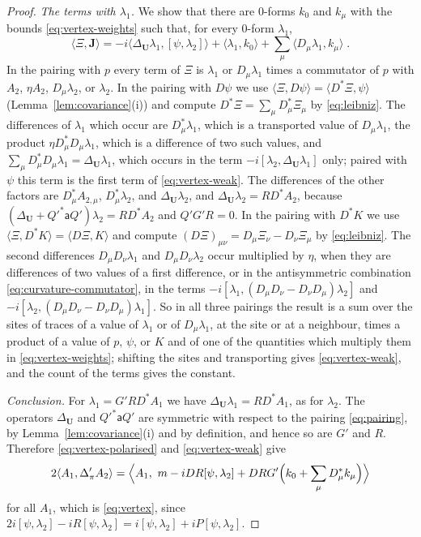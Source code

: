 \documentclass[11pt]{preprint}
\numberwithin{equation}{section}
\begin{document}
\begin{proof}
\emph{The terms with $\lambda_1$.} We show that there are $0$-forms $k_0$ and $k_\mu$ with the bounds \eqref{eq:vertex-weights} such that, for every $0$-form $\lambda_1$,
\begin{equation}\label{eq:vertex-weak}
    \langle\Xi, \mathbf J\rangle = -i\bigl\langle\Delta_{\mathbf U}\lambda_1, [\psi, \lambda_2]\bigr\rangle + \langle\lambda_1, k_0\rangle + \sum_\mu\langle D_\mu\lambda_1, k_\mu\rangle\;.
\end{equation}
In the pairing with $p$ every term of $\Xi$ is $\lambda_1$ or $D_\mu\lambda_1$ times a commutator of $p$ with $A_2$, $\eta A_2$, $D_\mu\lambda_2$, or $\lambda_2$. In the pairing with $D\psi$ we use $\langle\Xi, D\psi\rangle = \langle D^*\Xi, \psi\rangle$ (Lemma~\ref{lem:covariance}(i)) and compute $D^*\Xi = \sum_\mu D^*_\mu\Xi_\mu$ by \eqref{eq:leibniz}. The differences of $\lambda_1$ which occur are $D^*_\mu\lambda_1$, which is a transported value of $D_\mu\lambda_1$, the product $\eta D^*_\mu D_\mu\lambda_1$, which is a difference of two such values, and $\sum_\mu D^*_\mu D_\mu\lambda_1 = \Delta_{\mathbf U}\lambda_1$, which occurs in the term $-i[\lambda_2, \Delta_{\mathbf U}\lambda_1]$ only; paired with $\psi$ this term is the first term of \eqref{eq:vertex-weak}. The differences of the other factors are $D^*_\mu A_{2,\mu}$, $D^*_\mu\lambda_2$, and $\Delta_{\mathbf U}\lambda_2$, and $\Delta_{\mathbf U}\lambda_2 = RD^*A_2$, because $(\Delta_{\mathbf U} + Q'^*\mathsf aQ')\lambda_2 = RD^*A_2$ and $Q'G'R = 0$. In the pairing with $D^*K$ we use $\langle\Xi, D^*K\rangle = \langle D\Xi, K\rangle$ and compute $(D\Xi)_{\mu\nu} = D_\mu\Xi_\nu - D_\nu\Xi_\mu$ by \eqref{eq:leibniz}. The second differences $D_\mu D_\nu\lambda_1$ and $D_\mu D_\nu\lambda_2$ occur multiplied by $\eta$, when they are differences of two values of a first difference, or in the antisymmetric combination \eqref{eq:curvature-commutator}, in the terms $-i[\lambda_1, (D_\mu D_\nu - D_\nu D_\mu)\lambda_2]$ and $-i[\lambda_2, (D_\mu D_\nu - D_\nu D_\mu)\lambda_1]$. So in all three pairings the result is a sum over the sites of traces of a value of $\lambda_1$ or of $D_\mu\lambda_1$, at the site or at a neighbour, times a product of a value of $p$, $\psi$, or $K$ and of one of the quantities which multiply them in \eqref{eq:vertex-weights}; shifting the sites and transporting gives \eqref{eq:vertex-weak}, and the count of the terms gives the constant.

\emph{Conclusion.} For $\lambda_1 = G'RD^*A_1$ we have $\Delta_{\mathbf U}\lambda_1 = RD^*A_1$, as for $\lambda_2$. The operators $\Delta_{\mathbf U}$ and $Q'^*\mathsf aQ'$ are symmetric with respect to the pairing \eqref{eq:pairing}, by Lemma~\ref{lem:covariance}(i) and by definition, and hence so are $G'$ and $R$. Therefore \eqref{eq:vertex-polarised} and \eqref{eq:vertex-weak} give
\[
    2\langle A_1, \Delta'_\pi A_2\rangle = \Bigl\langle A_1,\ m - iDR[\psi, \lambda_2] + DRG'\Bigl(k_0 + \sum_\mu D^*_\mu k_\mu\Bigr)\Bigr\rangle
\]
for all $A_1$, which is \eqref{eq:vertex}, since $2i[\psi, \lambda_2] - iR[\psi, \lambda_2] = i[\psi, \lambda_2] + iP[\psi, \lambda_2]$.
\end{proof}
\end{document}
